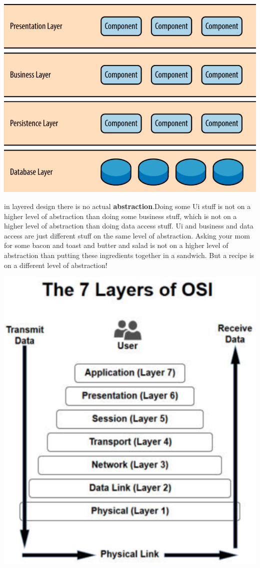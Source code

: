 \documentclass[a4paper,twoside]{article}
\numberwithin{equation}{section}
\begin{document}
\begin{center}
    \includegraphics[scale = 0.3]{assets/layered_design_two.png}
\end{center}
in layered design there is no actual \textbf{abstraction}.Doing some Ui stuff is not on a higher level of abstraction than doing some business stuff, which is not on a higher level of abstraction than doing data access stuff. Ui and business and data access are just different stuff on the same level of abstraction. Asking your mom for some bacon and toast and butter and salad is not on a higher level of abstraction than putting these ingredients together in a sandwich. But a recipe is on a different level of abstraction!
\begin{center}
    \includegraphics[scale = 0.3]{assets/osi_layers.png}
\end{center}
\end{document}
